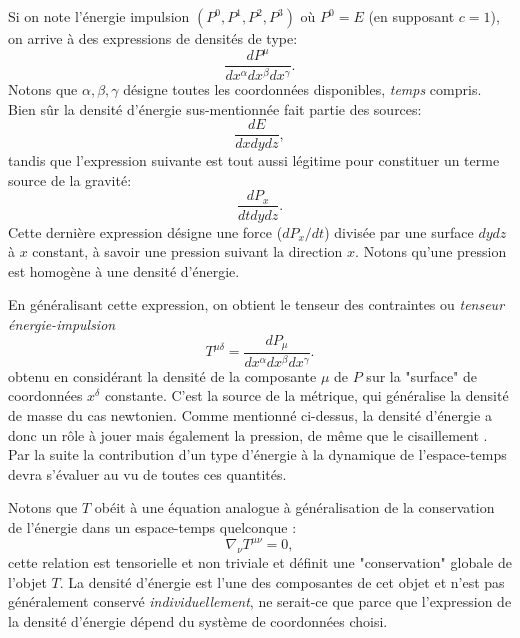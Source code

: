 Si on note l'énergie impulsion $(P^0,P^1,P^2,P^3)$ où $P^0=E$ (en supposant $c=1$), on arrive à des expressions de densités de type:
\begin{equation}
\frac{dP^\mu}{dx^\alpha dx^\beta dx^\gamma}.
\end{equation}
Notons que $\alpha,\beta,\gamma$ désigne toutes les coordonnées disponibles, \textit{temps} compris. Bien sûr la densité d'énergie sus-mentionnée fait partie des sources:
\begin{equation}
\frac{dE}{dx dy dz},
\end{equation}
tandis que l'expression suivante est tout aussi légitime pour constituer un terme source de la gravité:
\begin{equation}
\frac{dP_x}{dtdydz}.
\end{equation}
Cette dernière expression désigne une force ($dP_x/dt$) divisée par une surface $dydz$ à $x$ constant, à savoir une pression suivant la direction $x$. Notons qu'une pression est homogène à une densité d'énergie.

En généralisant cette expression, on obtient le tenseur des contraintes ou \textit{tenseur énergie-impulsion}
\begin{equation}
T^{\mu\delta} = \frac{dP_\mu}{dx^\alpha dx^\beta dx^\gamma}.
\end{equation}
obtenu en considérant la densité de la composante $\mu$ de $P$ sur la "surface" de coordonnées $x^\delta$ constante. C'est la source de la métrique, qui généralise la densité de masse du cas newtonien.  Comme mentionné ci-dessus, la densité d'énergie a donc un rôle à jouer mais également la pression, de même que le cisaillement . Par la suite la contribution d'un type d'énergie à la dynamique de l'espace-temps devra s'évaluer au vu de toutes ces quantités. 

Notons que $T$ obéit à une équation analogue à généralisation de la conservation de l'énergie dans un espace-temps quelconque : 
 \begin{equation}
 \nabla_\nu T^{\mu\nu}=0,
 \label{e:divT}
 \end{equation}
 cette relation est tensorielle et non triviale et définit une "conservation" globale de l'objet $T$. La densité d'énergie est l'une des composantes de cet objet et n'est pas généralement conservé \textit{individuellement}, ne serait-ce que parce que l'expression de la densité d'énergie dépend du système de coordonnées choisi.

